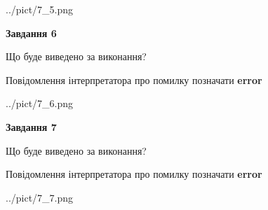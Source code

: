 \documentclass[10pt, ukrainian]{article}
\begin{document}
{\begin {large}
\begin{center}
	{../pict/7_5.png}
\end{center}
\newpage

{\begin {center}\textbf{Завдання 6}\end {center}}\par
Що буде виведено за виконання? \par
Повідомлення інтерпретатора про помилку позначати \textbf{error}

\begin{center}
	{../pict/7_6.png}
\end{center}
\newpage

{\begin {center}\textbf{Завдання 7}\end {center}}\par
Що буде виведено за виконання? \par
Повідомлення інтерпретатора про помилку позначати \textbf{error}

\begin{center}
	{../pict/7_7.png}
\end{center}
\newpage

\end {large}}
\end{document}
